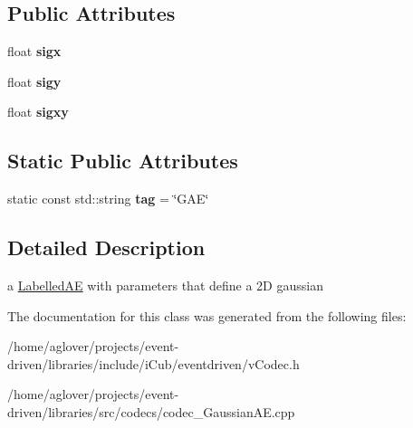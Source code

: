 \subsection*{Public Attributes}
\begin{DoxyCompactItemize}
\item 
float {\bfseries sigx}\hypertarget{classev_1_1GaussianAE_a2d4a7509a323da592be70372f41b09fe}{}\label{classev_1_1GaussianAE_a2d4a7509a323da592be70372f41b09fe}

\item 
float {\bfseries sigy}\hypertarget{classev_1_1GaussianAE_add6bf41b0ffbcbbecea6a63edb81b5b7}{}\label{classev_1_1GaussianAE_add6bf41b0ffbcbbecea6a63edb81b5b7}

\item 
float {\bfseries sigxy}\hypertarget{classev_1_1GaussianAE_a8d04e93f101622ce1f0240f0e02c5c90}{}\label{classev_1_1GaussianAE_a8d04e93f101622ce1f0240f0e02c5c90}

\end{DoxyCompactItemize}
\subsection*{Static Public Attributes}
\begin{DoxyCompactItemize}
\item 
static const std\+::string {\bfseries tag} = \char`\"{}G\+AE\char`\"{}\hypertarget{classev_1_1GaussianAE_a6d0ea5de274ddd380b056d2ba8b019e2}{}\label{classev_1_1GaussianAE_a6d0ea5de274ddd380b056d2ba8b019e2}

\end{DoxyCompactItemize}


\subsection{Detailed Description}
a \hyperlink{classev_1_1LabelledAE}{Labelled\+AE} with parameters that define a 2D gaussian 

The documentation for this class was generated from the following files\+:\begin{DoxyCompactItemize}
\item 
/home/aglover/projects/event-\/driven/libraries/include/i\+Cub/eventdriven/v\+Codec.\+h\item 
/home/aglover/projects/event-\/driven/libraries/src/codecs/codec\+\_\+\+Gaussian\+A\+E.\+cpp\end{DoxyCompactItemize}
